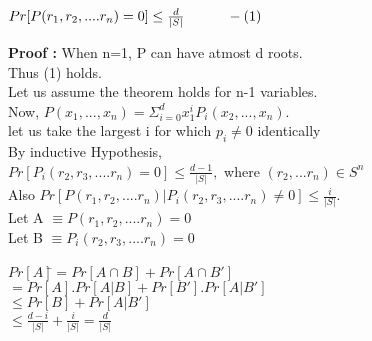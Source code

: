 \documentclass[12pt]{article}
\begin{document}
\begin{center}
$Pr[P(r_{1},r_{2},....r_{n})=0] \leq \frac{d}{|S|} \hspace{30 pt} -(1)$
\end{center}
{\bf Proof :} When n=1, P can have atmost d roots.\\
Thus (1) holds.\\
Let us assume the theorem holds for n-1 variables.\\ 
Now, $P(x_{1},...,x_{n})=  \Sigma_{i=0}^{d} x_{1}^{i} P_{i}(x_{2},...,x_{n})$.\\
let us take the largest i for which $p_{i} \neq 0 $ identically\\
By inductive Hypothesis,\\
$Pr[P_{i}(r_{2},r_{3},....r_{n})=0] \leq \frac{d-1}{|S|},$ where $(r_{2},...r_{n}) \in S^{n}$\\
Also $Pr[P(r_{1},r_{2},....r_{n})| P_{i}(r_{2},r_{3},....r_{n}) \neq 0] \leq \frac{i}{|S|}$.\\
Let A $\equiv P(r_{1},r_{2},....r_{n}) = 0 $\\
Let B $\equiv P_{i}(r_{2},r_{3},....r_{n}) = 0 $\\
\begin{tabbing}
$Pr[A] $\=$ = Pr[A \cap B] +Pr[A \cap B'] $\\
\> $= Pr[A].Pr[A|B]+Pr[B'].Pr[A|B']$\\
\> $\leq Pr[B]+Pr[A|B']$\\
\> $\leq \frac{d-i}{|S|} + \frac{i}{|S|} = \frac{d}{|S|}$
\end{tabbing}
\end{document}
